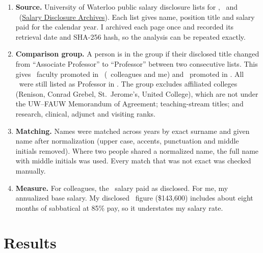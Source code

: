 \documentclass{article}
\newif\ifUnitComparisons
\begin{document}
\begin{enumerate}[leftmargin=*,itemsep=0.2em]
    \item \textbf{Source.} University of Waterloo public salary disclosure lists for \PoolEarlierYear, \PoolPrevYear\ and \PoolYear\ (\href{https://uwaterloo.ca/about/accountability/salary-disclosure}{Salary Disclosure Archives}). Each list gives name, position title and salary paid for the calendar year. I archived each page once and recorded its retrieval date and SHA-256 hash, so the analysis can be repeated exactly.
    \item \textbf{Comparison group.} A person is in the group if their disclosed title changed from ``Associate Professor'' to ``Professor'' between two consecutive lists. This gives \PoolNCurrent\ faculty promoted in \PoolYear\ (\the\numexpr{}\relax\ colleagues and me) and \PoolNEarlier\ promoted in \PoolPrevYear. All \PoolNEarlierKept\ were still listed as Professor in \PoolYear. The group excludes affiliated colleges (Renison, Conrad Grebel, St.\ Jerome's, United College), which are not under the UW--FAUW Memorandum of Agreement; teaching-stream titles; and research, clinical, adjunct and visiting ranks.
    \item \textbf{Matching.} Names were matched across years by exact surname and given name after normalization (upper case, accents, punctuation and middle initials removed). Where two people shared a normalized name, the full name with middle initials was used. Every match that was not exact was checked manually.
    \item \textbf{Measure.} For colleagues, the \PoolYear\ salary paid as disclosed. For me, my annualized base salary. My disclosed \PoolYear\ figure (\$143{,}600) includes about eight months of sabbatical at 85\% pay, so it understates my salary rate.
\ifUnitComparisons
    \item \textbf{Faculty and School comparisons.} Faculty of Health members were identified from the public faculty listings of the Faculty's three units (SPHS, Kinesiology and Health Sciences, and Recreation and Leisure Studies), retrieved \HealthRosterDate. A member of the comparison group was counted only if surname and first given name both matched a listing. SPHS faculty were identified from the public SPHS faculty listing. For both units, this report gives only my rank. It does not report any colleague's salary.
\fi
\end{enumerate}

\section*{Results}
\end{document}
